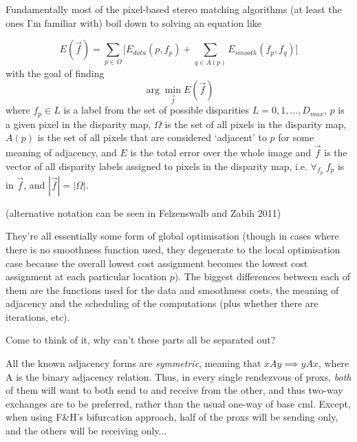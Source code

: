 \chapter{}

Fundamentally most of the pixel-based stereo matching algorithms (at least the ones I'm familiar with) boil down to solving an equation like

\[ E(\vec{f}) = \sum_{p \in \Omega} \Bigg[ E_{data}(p, f_p) + \sum_{q \in A(p)} E_{smooth}(f_p, f_q)\Bigg] \] with the goal of finding
\[ \arg\min_{\vec{f}} E(\vec{f})\] where \(f_p \in L\) is a label from the set of possible disparities \(L = 0, 1, \ldots, D_{max}\), \(p\) is a given pixel in the disparity map, \(\Omega\) is the set of all pixels in the disparity map, \(A(p)\) is the set of all pixels that are considered `adjacent' to \(p\) for some meaning of adjacency, and \(E\) is the total error over the whole image and \(\vec{f}\) is the vector of all disparity labels assigned to pixels in the disparity map, i.e. \( \forall_{f_p}~f_p\) is in \(\vec{f}\), and \(|\vec{f}| = |\Omega|\).

(alternative notation can be seen in Felzenswalb and Zabih 2011)

They're all essentially some form of global optimisation (though in cases where there is no smoothness function used, they degenerate to the local optimisation case because the overall lowest cost assignment becomes the lowest cost assignment at each particular location \(p\)).  The biggest differences between each of them are the functions used for the data and smoothness costs, the meaning of adjacency and the scheduling of the computations (plus whether there are iterations, etc).

Come to think of it, why can't these parts all be separated out?

All the known adjacency forms are \emph{symmetric}, meaning that \(x A y \implies y A x\), where A is the binary adjacency relation.  Thus, in every single rendezvous of \glspl{prox}, \emph{both} of them will want to both send to and receive from the other, and thus two-way exchanges are to be preferred, rather than the usual one-way of base \gls{cml}.  Except, when using F\&H's bifurcation approach, half of the \glspl{prox} will be sending only, and the others will be receiving only...

